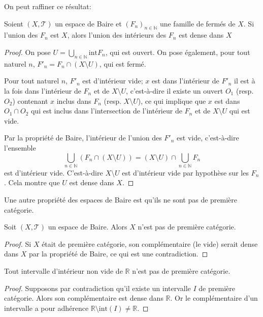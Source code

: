 On peut raffiner ce résultat:
\begin{prop}
  Soient $(X, \mathcal{T})$ un espace de Baire et $(F_n)_{n\in\mathbb N}$
  une famille de fermés de $X$. Si l'union des $F_n$ est $X$,
  alors l'union des intérieurs des $F_n$ est dense dans $X$
\end{prop}

\begin{proof}
  On pose $U = \bigcup_{n\in\mathbb N} \mathrm{int}F_n$, qui est
  ouvert. On pose également, pour tout naturel $n$,
  $F'_n = F_n\cap (X\setminus U)$, qui est fermé.

  Pour tout naturel $n$, $F'_n$ est d'intérieur vide; $x$ est dans
  l'intérieur de $F'_n$ \ssi{} il est à la fois dans l'intérieur de
  $F_n$ et de $X\setminus U$, c'est-à-dire il existe un ouvert $O_1$
  (resp. $O_2$) contenant $x$ inclus dans $F_n$ (resp. $X\setminus U$),
  ce qui implique que $x$ est dans $O_1\cap O_2$ qui est inclus dans
  l'intersection de l'intérieur de $F_n$ et de $X\setminus U$ qui est vide.

  Par la propriété de Baire, l'intérieur de l'union des $F'_n$ est vide,
  c'est-à-dire l'ensemble
  $$\bigcup_{n\in\mathbb N} \left(F_n \cap (X\setminus U)\right) =
  (X\setminus U)\cap \bigcup_{n\in\mathbb N} F_n$$
  est d'intérieur vide. C'est-à-dire $X\setminus U$ est d'intérieur vide
  par hypothèse sur les $F_n$. Cela montre que
  $U$ est dense dans $X$.
\end{proof}

Une autre propriété des espaces de Baire est qu'ils ne sont pas de première
catégorie.
\begin{prop}
  Soit $(X, \mathcal T)$ un espace de Baire. Alors $X$ n'est pas de
  première catégorie.
\end{prop}
\begin{proof}
  Si $X$ était de première catégorie, son complémentaire (le vide) serait
  dense dans $X$ par la propriété de Baire, ce qui est une contradiction.
\end{proof}

\begin{prop}
  Tout intervalle d'intérieur non vide de $\mathbb R$ n'est pas de
  première catégorie.
\end{prop}
\begin{proof}
  Supposons par contradiction qu'il existe un intervalle $I$
  de première catégorie. Alors son complémentaire est dense dans
  $\mathbb R$. Or le complémentaire d'un intervalle a pour
  adhérence $\mathbb R\setminus \mathrm{int}(I)\neq \mathbb R$.
\end{proof}

